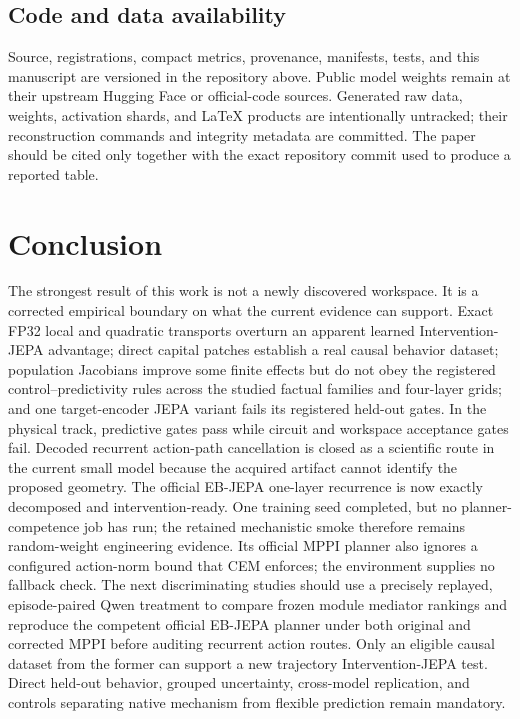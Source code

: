 \documentclass[10pt]{article}
\begin{document}
\subsection*{Code and data availability}

Source, registrations, compact metrics, provenance, manifests, tests, and this
manuscript are versioned in the repository above.  Public model weights remain
at their upstream Hugging Face or official-code sources.  Generated raw data,
weights, activation shards, and LaTeX products are intentionally untracked;
their reconstruction commands and integrity metadata are committed.  The
paper should be cited only together with the exact repository commit used to
produce a reported table.

\section{Conclusion}

The strongest result of this work is not a newly discovered workspace.  It is
a corrected empirical boundary on what the current evidence can support.
Exact FP32 local and quadratic transports overturn an apparent learned
Intervention-JEPA advantage; direct capital patches establish a real causal
behavior dataset; population Jacobians improve some finite effects but do not
obey the registered control--predictivity rules across the studied factual
families and four-layer grids; and one target-encoder JEPA variant fails its
registered held-out gates.  In the physical track, predictive gates pass while
circuit and workspace acceptance gates fail.  Decoded recurrent action-path
cancellation is closed as a scientific route in the current small model because
the acquired artifact cannot identify the proposed geometry.  The official
EB-JEPA one-layer recurrence is now exactly decomposed and intervention-ready.
One training seed completed, but no planner-competence job has run; the retained
mechanistic smoke therefore remains random-weight engineering evidence. Its official MPPI planner also
ignores a configured action-norm bound that CEM enforces; the environment supplies
no fallback check.  The next discriminating studies should use a precisely
replayed, episode-paired Qwen treatment to compare frozen module mediator rankings and reproduce the
competent official EB-JEPA planner under both original and corrected MPPI before
auditing recurrent action routes.  Only an eligible causal dataset from
the former can support a new trajectory Intervention-JEPA test.  Direct held-out
behavior, grouped uncertainty, cross-model replication, and controls separating
native mechanism from flexible prediction remain mandatory.



\end{document}

